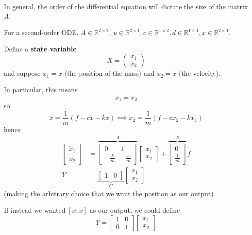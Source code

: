 \documentclass[12pt]{article}
\newcommand{\R}{\mathbb{R}}
\newcommand*{\tbf}[1]{\ifmmode\mathbf{#1}\else\textbf{#1}\fi}
\begin{document}
In general, the order of the differential equation will dictate the size of the matrix $A$. 

For a second-order ODE, $A \in \R^{2 \times 2}$, $u \in \R^{2\times 1}, c \in \R^{1 \times 2}, d \in \R^{1 \times 1}, x \in \R^{2\times 1}$. 

Define a \tbf{state variable}
\[X = \begin{pmatrix}
    x_1\\x_2
\end{pmatrix}\]
and suppose $x_1 = x$ (the position of the mass) and $x_2 = \dot x$ (the velocity). 

In particular, this means 
\[\dot x_1 = x_2\]
so 
\[\ddot x = \frac{1}{m}(f - c\dot x - kx) \implies \dot x_2 = \frac{1}{m}(f - cx_2 - kx_1)\]
hence 
\begin{align*}
    \begin{bmatrix}
        \dot x_1\\ \dot x_2
    \end{bmatrix} &= \overbrace{\begin{bmatrix}
        0 & 1\\ 
        -\frac{k}{m} & -\frac{c}{m}
    \end{bmatrix}}^A \begin{bmatrix}
        x_1\\ x_2
    \end{bmatrix} + \overbrace{\begin{bmatrix}
        0\\ \frac{1}{m}
    \end{bmatrix}}^B f\\ 
    Y &= \underbrace{\begin{bmatrix}
        1 & 0
    \end{bmatrix}}_C \begin{bmatrix}
        x_1\\ x_2
    \end{bmatrix}
\end{align*}
(making the arbitrary choice that we want the position as our output)

If instead we wanted $[x, \dot x]$ as our output, we could define 
\[Y = \begin{bmatrix}
        1 & 0\\ 
        0 & 1
    \end{bmatrix} \begin{bmatrix}
        x_1\\ x_2
    \end{bmatrix}\]
\end{document}
